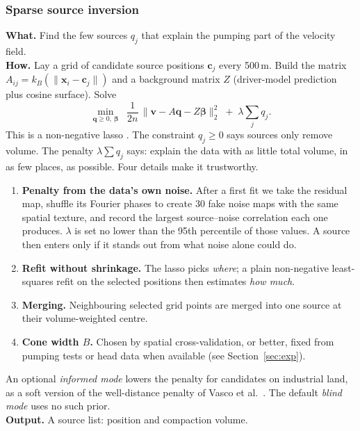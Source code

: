 \subsubsection{ Sparse source inversion}
\textbf{What.} Find the few sources $q_j$ that explain the pumping part of the velocity field.\\
\textbf{How.} Lay a grid of candidate source positions $\mathbf{c}_j$ every 500\,m. Build the matrix
$A_{ij}=k_B(\lVert\mathbf{x}_i-\mathbf{c}_j\rVert)$ and a background matrix $Z$ (driver-model
prediction plus cosine surface). Solve
\begin{equation}
\min_{\mathbf{q}\ge 0,\ \boldsymbol\beta}\;\; \frac{1}{2n}\,\big\lVert \mathbf{v}-A\mathbf{q}-Z\boldsymbol\beta\big\rVert_2^2
\;+\;\lambda\sum_j q_j .
\label{eq:lasso}
\end{equation}
This is a non-negative lasso \cite{tibshirani1996}. The constraint $q_j\ge 0$ says sources only
remove volume. The penalty $\lambda\sum q_j$ says: explain the data with as little total volume, in
as few places, as possible. Four details make it trustworthy.
\begin{enumerate}
\item \textbf{Penalty from the data's own noise.} After a first fit we take the residual map, shuffle
its Fourier phases to create 30 fake noise maps with the same spatial texture, and record the
largest source--noise correlation each one produces. $\lambda$ is set no lower than the 95th
percentile of those values. A source then enters only if it stands out from what noise alone could
do.
\item \textbf{Refit without shrinkage.} The lasso picks \emph{where}; a plain non-negative
least-squares refit on the selected positions then estimates \emph{how much}.
\item \textbf{Merging.} Neighbouring selected grid points are merged into one source at their
volume-weighted centre.
\item \textbf{Cone width $B$.} Chosen by spatial cross-validation, or better, fixed from pumping
tests or head data when available (see Section~\ref{sec:exp}).
\end{enumerate}
An optional \emph{informed mode} lowers the penalty for candidates on industrial land, as a soft
version of the well-distance penalty of Vasco et al.\ \cite{vasco2019}. The default \emph{blind mode}
uses no such prior.\\
\textbf{Output.} A source list: position and compaction volume.

